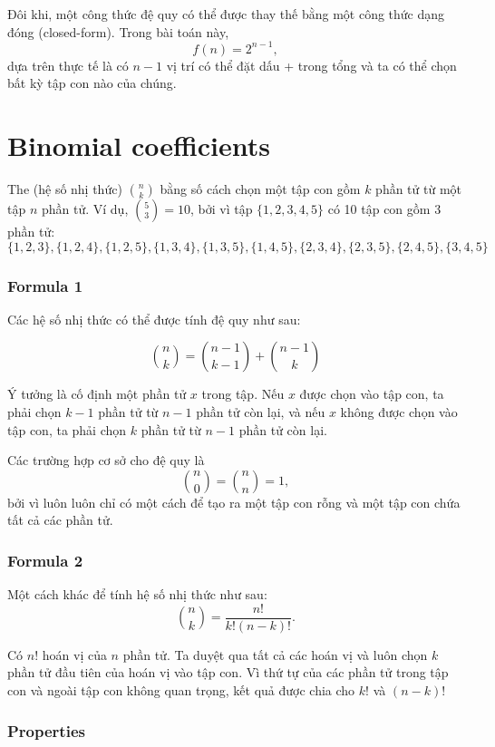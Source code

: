 Đôi khi, một công thức đệ quy có thể được thay thế
bằng một công thức dạng đóng (closed-form).
Trong bài toán này,
\[
f(n)=2^{n-1},
\]
dựa trên thực tế là có $n-1$
vị trí có thể đặt dấu + trong tổng
và ta có thể chọn bất kỳ tập con nào của chúng.

\section{Binomial coefficients}


The  (hệ số nhị thức) ${n \choose k}$
bằng số cách chọn một tập con
gồm $k$ phần tử từ một tập $n$ phần tử.
Ví dụ, ${5 \choose 3}=10$,
bởi vì tập $\{1,2,3,4,5\}$
có 10 tập con gồm 3 phần tử:
\[ \{1,2,3\}, \{1,2,4\}, \{1,2,5\}, \{1,3,4\}, \{1,3,5\}, 
\{1,4,5\}, \{2,3,4\}, \{2,3,5\}, \{2,4,5\}, \{3,4,5\} \]

\subsubsection{Formula 1}

Các hệ số nhị thức có thể được
tính đệ quy như sau:

\[
{n \choose k}  =  {n-1 \choose k-1} + {n-1 \choose k}
\]

Ý tưởng là cố định một phần tử $x$ trong tập.
Nếu $x$ được chọn vào tập con,
ta phải chọn $k-1$
phần tử từ $n-1$ phần tử còn lại,
và nếu $x$ không được chọn vào tập con,
ta phải chọn $k$ phần tử từ $n-1$ phần tử còn lại.

Các trường hợp cơ sở cho đệ quy là
\[
{n \choose 0}  =  {n \choose n} = 1,
\]
bởi vì luôn luôn chỉ có
một cách để tạo ra một tập con rỗng
và một tập con chứa tất cả các phần tử.

\subsubsection{Formula 2}

Một cách khác để tính hệ số nhị thức như sau:
\[
{n \choose k}  =  \frac{n!}{k!(n-k)!}.
\]

Có $n!$ hoán vị của $n$ phần tử.
Ta duyệt qua tất cả các hoán vị và luôn
chọn $k$ phần tử đầu tiên của hoán vị
vào tập con.
Vì thứ tự của các phần tử trong tập con
và ngoài tập con không quan trọng,
kết quả được chia cho $k!$ và $(n-k)!$

\subsubsection{Properties}

